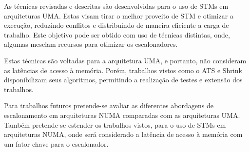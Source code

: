 \documentclass[ti]{texufpel}
\begin{document}
As técnicas revisadas e descritas são desenvolvidas para o uso de STMs em arquiteturas UMA. Estas visam tirar o melhor proveito de STM e otimizar a execução, reduzindo conflitos e distribuindo de maneira eficiente a carga de trabalho. Este objetivo pode ser obtido com uso de técnicas distintas, onde, algumas mesclam recursos para otimizar os escalonadores.

Estas técnicas são voltadas para a arquitetura UMA, e portanto, não consideram as latências de acesso à memória. Porém, trabalhos vistos como o ATS e Shrink disponibilizam seus algoritmos, permitindo a realização de testes e extensão dos trabalhos.

Para trabalhos futuros pretende-se avaliar as diferentes abordagens de escalonamento em arquiteturas NUMA comparadas com as arquiteturas UMA. Também pretende-se estender os trabalhos vistos, para o uso de STMs em arquiteturas NUMA, onde será considerado a latência de acesso à memória com um fator chave para o escalonador.



\end{document}

